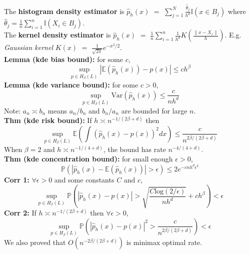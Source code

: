 \documentclass[10pt,twocolumn]{article}
\begin{document}
    The \textbf{histogram density estimator} is 
        $\hat{p}_h(x)$ $=$ $\sum_{j=1}^N \frac{\hat{\theta}_j}{h^d} \mathbb{I}(x \in B_j)$
        where $\hat{\theta}_j = \frac{1}{n} \sum_{i=1}^n \mathbb{I}(X_i \in B_j)$.\\
    The \textbf{kernel density estimator} is 
    $\hat{p}_h(x)$ $=$ $\frac{1}{n} \sum_{i=1}^n \frac{1}{h^d} K \left( \frac{\| x-X_i \|}{h}  \right).$
    E.g. \emph{Gaussian kernel} $K(x)$ $=$ $\frac{1}{\sqrt{2\pi}} e^{-x^2/2}$.\\
    \textbf{Lemma (kde bias bound):} for some $c$, 
    \begin{equation}
        \sup_{p \in H_{\beta}(L)} |\mathbb{E}\left(\hat{p}_h(x)\right) - p(x)| \leq ch^{\beta}
    \end{equation}
    \textbf{Lemma (kde variance bound):} for some $c>0$, 
    \begin{equation}
        \sup_{p \in H_{\beta}(L)} \text{Var}(\hat{p}_h(x)) \leq \frac{c}{nh^d}
    \end{equation}
    Note: $a_n \asymp b_n$ means $a_n/b_n$ and $b_n/a_n$ are bounded for large $n$.\\
    \textbf{Thm (kde risk bound):} If $h \asymp n^{-1/(2\beta + d)}$ then
    \begin{equation}
        \sup_{p \in H_{\beta}(L)} \mathbb{E} \left( \int (\hat{p}_h(x) - p(x))^2 dx \right) 
        \leq \frac{c}{n^{2\beta/(2\beta+d)}}
    \end{equation}
    When $\beta=2$ and $h \asymp n^{-1/(4+d)}$, the bound has rate $n^{-4/(4+d)}$.\\
    \textbf{Thm (kde concentration bound):} for small enough $\epsilon >0$,
    \begin{equation}
        \mathbb{P}(|\hat{p}_h(x) - \mathbb{E}(\hat{p}_h(x))| > \epsilon) 
            \leq 2 e^{-cnh^d \epsilon^2}
    \end{equation}
    \textbf{Corr 1:} $\forall \epsilon>0$ and some constants $C$ and $c$,
    \begin{equation}
        \sup_{p \in H_{\beta}(L)} \mathbb{P} \left( | \hat{p}_h(x) - p(x) | > \sqrt{ \frac{C\text{log}(2/\epsilon)}{nh^d} } + ch^{\beta} \right)
            < \epsilon
    \end{equation}
    \textbf{Corr 2:} If $h \asymp n^{-1/(2\beta + d)}$ then $\forall \epsilon >0$,
    \begin{equation}
        \sup_{p \in H_{\beta}(L)} \mathbb{P} \left( | \hat{p}_h(x) - p(x) |^2 > \frac{c}{n^{2\beta/(2\beta + d)}} \right)
            < \epsilon
    \end{equation}
    We also proved that $O(n^{-2\beta/(2\beta + d)})$ is minimax optimal rate.
\end{document}
